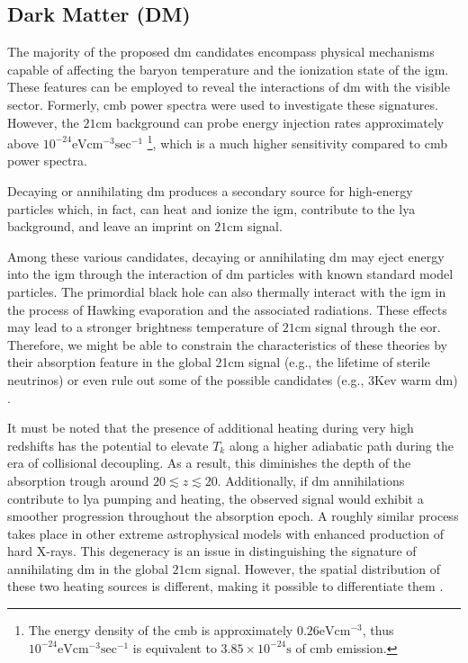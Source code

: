 \documentclass[12pt, TexShade, letterpaper]{report}
\begin{document}
\subsection{Dark Matter (DM)}
The majority of the proposed \gls{dm} candidates encompass physical mechanisms capable of affecting the baryon temperature and the ionization state of the \gls{igm}. These features can be employed to reveal the interactions of \gls{dm} with the visible sector. Formerly, \gls{cmb} power spectra were used to investigate these signatures. However, the $\mathrm{21cm}$ background can probe energy injection rates approximately above $\mathrm{10^{-24}eV cm^{-3} sec^{-1}}$ \footnote{The energy density of the \gls{cmb} is approximately $\mathrm{0.26 eV cm^{-3}}$, thus $\mathrm{10^{-24}eV cm^{-3} sec^{-1}}$ is equivalent to $\mathrm{3.85 \times 10^{-24} s}$ of \gls{cmb} emission.}, which is a much higher sensitivity compared to \gls{cmb} power spectra.\par
Decaying or annihilating \gls{dm} produces a secondary source for high-energy particles which, in fact, can heat and ionize the \gls{igm}, contribute to the \gls{lya} background, and leave an imprint on $\mathrm{21cm}$ signal.\par
Among these various candidates, decaying or annihilating \gls{dm} may eject energy into the \gls{igm} through the interaction of \gls{dm} particles with known standard model particles. The primordial black hole can also thermally interact with the \gls{igm} in the process of Hawking evaporation and the associated radiations. These effects may lead to a stronger brightness temperature of $\mathrm{21cm}$ signal through the \gls{eor}.  Therefore, we might be able to constrain the characteristics of these theories by their absorption feature in the global 21cm signal (e.g., the lifetime of sterile neutrinos) or even rule out some of the possible candidates (e.g., $\mathrm{3 Kev}$ warm \gls{dm}) \cite{DM_anihilation_furlantto, constrain_dm_21, DM_anihilation_1, DM_ionize, dark_cosmology_21, snowmass_dm, rule_out, primordial_bh, new_physics_thesis, primordial_bh_binary, 21limit_dm_bh, bound_dm, sterile_neutrino}.\par

It must be noted that the presence of additional heating during very high redshifts has the potential to elevate $T_k$ along a higher adiabatic path during the era of collisional decoupling. As a result, this diminishes the depth of the absorption trough around $20 \lesssim z \lesssim 20$. Additionally, if \gls{dm} annihilations contribute to \gls{lya} pumping and heating, the observed signal would exhibit a smoother progression throughout the absorption epoch. A roughly similar process takes place in other extreme astrophysical models with enhanced production of hard X-rays. This degeneracy is an issue in distinguishing the signature of annihilating \gls{dm} in the global $\mathrm{21cm}$ signal. However, the spatial distribution of these two heating sources is different, making it possible to differentiate them \cite{dark_nature_21}. \par
\end{document}
